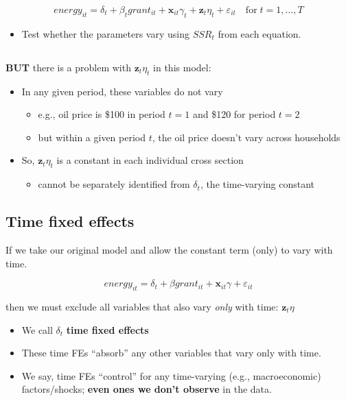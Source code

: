 \documentclass[
  letterpaper,
  DIV=11,
  numbers=noendperiod]{scrartcl}
\providecommand{\tightlist}{%
  \setlength{\itemsep}{0pt}\setlength{\parskip}{0pt}}
\begin{document}
\[
  energy_{it} = \delta_t + \beta_t grant_{it} + \mathbf{x}_{it}\gamma_t + \mathbf{z}_t\eta_t + \varepsilon_{it} \quad \text{for}\;t = 1,\dots,T
\]

\begin{itemize}
\tightlist
\item
  Test whether the parameters vary using \(SSR_t\) from each equation.
\end{itemize}

\subsection{}\label{section-1}

\textbf{BUT} there is a problem with \(\mathbf{z}_t\eta_t\) in this
model:

\begin{itemize}
\item
  In any given period, these variables do not vary

  \begin{itemize}
  \item
    e.g., oil price is \$100 in period \(t=1\) and \$120 for period
    \(t=2\)
  \item
    but within a given period \(t\), the oil price doesn't vary across
    households
  \end{itemize}
\item
  So, \(\mathbf{z}_t\eta_t\) is a constant in each individual cross
  section

  \begin{itemize}
  \tightlist
  \item
    cannot be separately identified from \(\delta_t\), the time-varying
    constant
  \end{itemize}
\end{itemize}

\subsection{Time fixed effects}\label{time-fixed-effects}

If we take our original model and allow the constant term (only) to vary
with time.

\[
  energy_{it} = \delta_t + \beta grant_{it} + \mathbf{x}_{it}\gamma + \varepsilon_{it}
\]

then we must exclude all variables that also vary \emph{only} with time:
\(\mathbf{z}_t\eta\)

\begin{itemize}
\item
  We call \(\delta_t\) \textbf{time fixed effects}
\item
  These time FEs ``absorb'' any other variables that vary only with
  time.
\item
  We say, time FEs ``control'' for any time-varying (e.g.,
  macroeconomic) factors/shocks; \textbf{even ones we don't observe} in
  the data.
\end{itemize}
\end{document}
